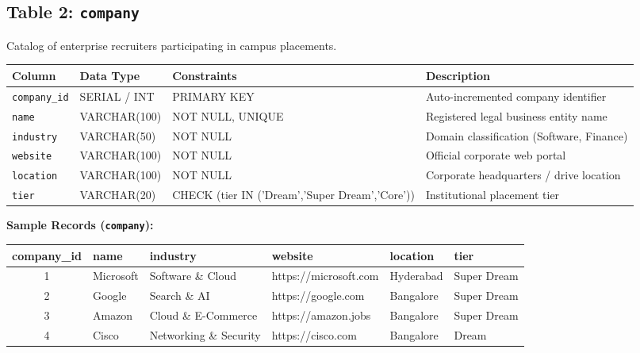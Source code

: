\documentclass[11pt,a4paper]{article}
\begin{document}
\subsection{Table 2: \texttt{company}}
Catalog of enterprise recruiters participating in campus placements.

\begin{table}[H]
    \centering
    \footnotesize
    \begin{tabularx}{\textwidth}{l l l X}
        \toprule
        \textbf{Column} & \textbf{Data Type} & \textbf{Constraints} & \textbf{Description} \\
        \midrule
        \texttt{company\_id} & SERIAL / INT & PRIMARY KEY & Auto-incremented company identifier \\
        \texttt{name} & VARCHAR(100) & NOT NULL, UNIQUE & Registered legal business entity name \\
        \texttt{industry} & VARCHAR(50) & NOT NULL & Domain classification (Software, Finance) \\
        \texttt{website} & VARCHAR(100) & NOT NULL & Official corporate web portal \\
        \texttt{location} & VARCHAR(100) & NOT NULL & Corporate headquarters / drive location \\
        \texttt{tier} & VARCHAR(20) & CHECK (tier IN ('Dream','Super Dream','Core')) & Institutional placement tier \\
        \bottomrule
    \end{tabularx}
\end{table}

\textbf{Sample Records (\texttt{company}):}
\begin{table}[H]
    \centering
    \scriptsize
    \begin{tabularx}{\textwidth}{c l l l l l}
        \toprule
        \textbf{company\_id} & \textbf{name} & \textbf{industry} & \textbf{website} & \textbf{location} & \textbf{tier} \\
        \midrule
        1 & Microsoft & Software \& Cloud & https://microsoft.com & Hyderabad & Super Dream \\
        2 & Google & Search \& AI & https://google.com & Bangalore & Super Dream \\
        3 & Amazon & Cloud \& E-Commerce & https://amazon.jobs & Bangalore & Super Dream \\
        4 & Cisco & Networking \& Security & https://cisco.com & Bangalore & Dream \\
        \bottomrule
    \end{tabularx}
\end{table}
\end{document}
